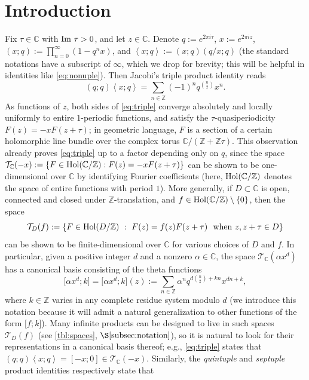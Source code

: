 \documentclass[reqno,11pt]{amsart}
\theoremstyle{definition}
\theoremstyle{remark}
\numberwithin{equation}{section}
\newcommand{\Z}{\mathbb{Z}}
\newcommand{\C}{\mathbb{C}}
\newcommand{\mT}{\mathcal{T}}
\renewcommand{\Im}{\textnormal{Im}\ }
\newcommand{\Hol}{\textnormal{Hol}}
\newcommand{\la}{\left\langle}
\newcommand{\ra}{\right\rangle}
\newcommand{\vect}[2]{\big[{#1};{#2}\big]}
\begin{document}
\vspace{-0.4cm}

\section{Introduction} \label{sec:intro}
Fix $\tau \in \C$ with $\Im \tau > 0$, and let $z \in \C$. Denote $q := e^{2\pi i \tau}$, $x := e^{2\pi i z}$, $(x; q) := \prod_{n = 0}^\infty \left(1 - q^n x\right)$, and $\la x; q \ra := (x; q)(q/x; q)$ (the standard notations have a subscript of $\infty$, which we drop for brevity; this will be helpful in identities like \cref{eq:nonuple}). Then Jacobi's triple product identity \cite[p.~10]{berndt2006number} reads
\begin{equation}\label{eq:triple}
    (q; q)\la x; q \ra =
    \sum_{n \in \Z} (-1)^n q^{\binom{n}{2}} x^n.
\end{equation}
As functions of $z$, both sides of \cref{eq:triple} converge absolutely and locally uniformly to entire $1$-periodic functions, and satisfy the $\tau$-quasiperiodicity $F(z) = -xF(z+\tau)$; in geometric language, $F$ is a section of a certain holomorphic line bundle over the complex torus $\C/(\Z + \Z\tau)$. This observation already proves \cref{eq:triple} up to a factor depending only on $q$, since the space $\mT_\C(-x) := \{F \in \Hol(\C/\Z) : F(z) = -x F(z+\tau)\}$ can be shown to be one-dimensional over $\C$ by identifying Fourier coefficients (here, $\Hol(\C/\Z)$ denotes the space of entire functions with period $1$). More generally, if $D \subset \C$ is open, connected and closed under $\Z$-translation, and $f \in \Hol(\C/\Z) \setminus \{0\}$, then the space
\[
\mT_D(f) := \left\{F \in \Hol(D/\Z)\ :\ F(z) = f(z) F(z+\tau)\ \text{ when } z, z + \tau \in D\right\}
\]
can be shown to be finite-dimensional over $\C$ for various choices of $D$ and $f$. In particular, given a positive integer $d$ and a nonzero $\alpha \in \C$, the space $\mT_\C\left(\alpha x^d\right)$ has a canonical basis consisting of the theta functions
\[
    \vect{\alpha x^d}{k} = \vect{\alpha x^d}{k}(z) := \sum_{n \in \Z} \alpha^n q^{d\binom{n}{2} + kn} x^{dn+k}, 
\]
where $k \in \Z$ varies in any complete residue system modulo $d$ (we introduce this notation because it will admit a natural generalization to other functions of the form $\vect{f}{k}$). Many infinite products can be designed to live in such spaces $\mT_D(f)$ (see \cref{tbl:spaces}, $\S \ref{subsec:notation}$), so it is natural to look for their representations in a canonical basis thereof; e.g., \cref{eq:triple} states that $(q; q)\la x; q \ra = [-x; 0] \in \mT_\C(-x)$. Similarly, the \emph{quintuple} \cite{watson1938ramanujans} and \emph{septuple} \cite{hirschhorn1983simple,chu2007unification,garvan2001generalization,foata2001triple} product identities respectively state that
\end{document}
